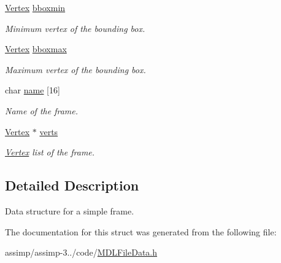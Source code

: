 \begin{DoxyCompactItemize}
\item 
\hypertarget{struct_assimp_1_1_m_d_l_1_1_simple_frame_a49aefd665c69737e8a2642d186327887}{\hyperlink{struct_assimp_1_1_m_d_l_1_1_vertex}{Vertex} \hyperlink{struct_assimp_1_1_m_d_l_1_1_simple_frame_a49aefd665c69737e8a2642d186327887}{bboxmin}}\label{struct_assimp_1_1_m_d_l_1_1_simple_frame_a49aefd665c69737e8a2642d186327887}

\begin{DoxyCompactList}\small\item\em Minimum vertex of the bounding box. \end{DoxyCompactList}\item 
\hypertarget{struct_assimp_1_1_m_d_l_1_1_simple_frame_aad2f9204fbd255a7fdd649a91d1fe42b}{\hyperlink{struct_assimp_1_1_m_d_l_1_1_vertex}{Vertex} \hyperlink{struct_assimp_1_1_m_d_l_1_1_simple_frame_aad2f9204fbd255a7fdd649a91d1fe42b}{bboxmax}}\label{struct_assimp_1_1_m_d_l_1_1_simple_frame_aad2f9204fbd255a7fdd649a91d1fe42b}

\begin{DoxyCompactList}\small\item\em Maximum vertex of the bounding box. \end{DoxyCompactList}\item 
\hypertarget{struct_assimp_1_1_m_d_l_1_1_simple_frame_a6a3a3b64541c83e6490fc4eaa8318d8f}{char \hyperlink{struct_assimp_1_1_m_d_l_1_1_simple_frame_a6a3a3b64541c83e6490fc4eaa8318d8f}{name} \mbox{[}16\mbox{]}}\label{struct_assimp_1_1_m_d_l_1_1_simple_frame_a6a3a3b64541c83e6490fc4eaa8318d8f}

\begin{DoxyCompactList}\small\item\em Name of the frame. \end{DoxyCompactList}\item 
\hypertarget{struct_assimp_1_1_m_d_l_1_1_simple_frame_a405a133e184ce6d1c2c2fc4647ed8b34}{\hyperlink{struct_assimp_1_1_m_d_l_1_1_vertex}{Vertex} $\ast$ \hyperlink{struct_assimp_1_1_m_d_l_1_1_simple_frame_a405a133e184ce6d1c2c2fc4647ed8b34}{verts}}\label{struct_assimp_1_1_m_d_l_1_1_simple_frame_a405a133e184ce6d1c2c2fc4647ed8b34}

\begin{DoxyCompactList}\small\item\em \hyperlink{struct_assimp_1_1_m_d_l_1_1_vertex}{Vertex} list of the frame. \end{DoxyCompactList}\end{DoxyCompactItemize}


\subsection{Detailed Description}
Data structure for a simple frame. 

The documentation for this struct was generated from the following file\+:\begin{DoxyCompactItemize}
\item 
assimp/assimp-\/3../code/\hyperlink{_m_d_l_file_data_8h}{M\+D\+L\+File\+Data.\+h}\end{DoxyCompactItemize}
